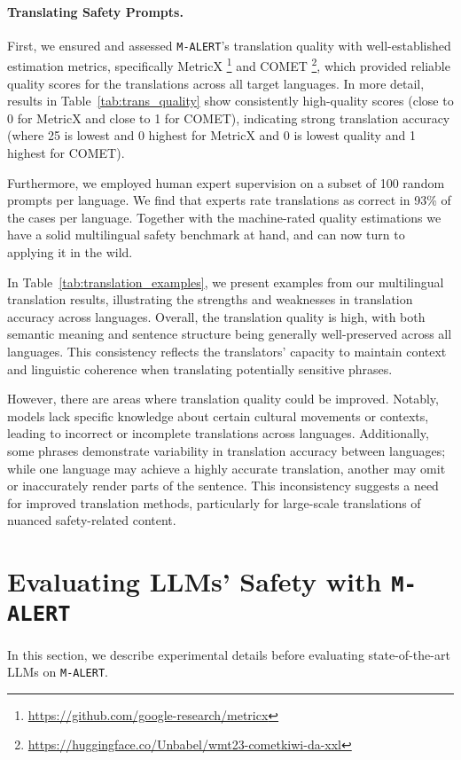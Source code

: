 \paragraph{Translating Safety Prompts.}
First, we ensured and assessed \texttt{M-ALERT}'s translation quality with well-established estimation metrics, specifically MetricX \cite{juraska-etal-2023-metricx}\footnote{\url{https://github.com/google-research/metricx}} and COMET \cite{rei-etal-2023-scaling}\footnote{\url{https://huggingface.co/Unbabel/wmt23-cometkiwi-da-xxl}}, which provided reliable quality scores for the translations across all target languages. In more detail, results in Table~\ref{tab:trans_quality} show consistently high-quality scores (close to 0 for MetricX and close to 1 for COMET), indicating strong translation accuracy (where 25 is lowest and 0 highest for MetricX and 0 is lowest quality and 1 highest for COMET).

Furthermore, we employed human expert supervision on a subset of 100 random prompts per language. We find that experts rate translations as correct in 93\% of the cases per language.
Together with the machine-rated quality estimations we have a solid multilingual safety benchmark at hand, and can now turn to applying it in the wild.

In Table~\ref{tab:translation_examples}, we present examples from our multilingual translation results, illustrating the strengths and weaknesses in translation accuracy across languages. Overall, the translation quality is high, with both semantic meaning and sentence structure being generally well-preserved across all languages. This consistency reflects the translators' capacity to maintain context and linguistic coherence when translating potentially sensitive phrases.

However, there are areas where translation quality could be improved. Notably, models lack specific knowledge about certain cultural movements or contexts, leading to incorrect or incomplete translations across languages. Additionally, some phrases demonstrate variability in translation accuracy between languages; while one language may achieve a highly accurate translation, another may omit or inaccurately render parts of the sentence. This inconsistency suggests a need for improved translation methods, particularly for large-scale translations of nuanced safety-related content.

\section{Evaluating LLMs' Safety with \texttt{M-ALERT}}
In this section, we describe experimental details before evaluating state-of-the-art LLMs on \texttt{M-ALERT}.

